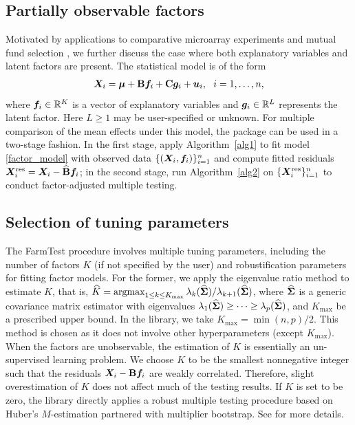 \subsection{Partially observable factors}\label{sec:mix_f}

Motivated by applications to comparative microarray experiments \citep{LS2008, FKC2009} and mutual fund selection \citep{LD2019}, we further discuss the case where both explanatory variables and latent factors are present. The statistical model is of the form
\begin{align}
	\bm{X}_i = \bm{\mu} + \mathbf{B} \bm f_i + \mathbf{C} \bm{g}_i +\bm{u}_i ,  \ \ i=1,\ldots, n ,  \nonumber
	\end{align}
where $\bm f_i \in \mathbb{R}^K$ is a vector of explanatory variables and $\bm{g}_i \in \mathbb{R}^L$ represents the latent factor.
Here $L\geq 1$ may be user-specified or unknown.
For multiple comparison of the mean effects under this model, the  package can be used in a two-stage fashion. In the first stage,  apply Algorithm~\ref{alg1} to fit model \eqref{factor_model} with observed data $\{( \bm{X}_i, \bm f_i)\}_{i=1}^n$ and compute fitted residuals $\bm{X}^{{\rm res}}_i = \bm{X}_i- \widehat{\mathbf{B}} \bm f_i$; in the second stage,  run Algorithm~\ref{alg2} on $\{\bm{X}^{{\rm res}}_i\}_{i=1}^n$ to conduct factor-adjusted multiple testing.

\subsection{Selection of tuning parameters}\label{sec:tuning}

The FarmTest procedure involves multiple tuning parameters, including the number of factors $K$ (if not specified by the user) and  robustification parameters for fitting factor models. For the former, we apply the eigenvalue ratio method \citep{LamYao,Ahn_Horen_2013} to estimate $K$, that is, $\widehat{K}=\mathop{\mathrm{argmax}}_{ 1\leq k \leq K_{\max}}  \lambda_k( \widehat {\bm{\Sigma}})/ \lambda_{k+1}( \widehat {\bm{\Sigma}} )$, where $\widehat {\bm{\Sigma}}$ is a generic covariance matrix estimator with eigenvalues $\lambda_1(\widehat {\bm{\Sigma}}) \geq \cdots \geq \lambda_p(\widehat  {\bm{\Sigma}})$, and $K_{\max}$ be a prescribed upper bound. In the library, we take $K_{\max} = \min(n,p)/2$.  This method is chosen as it does not involve other hyperparameters (except $K_{\max}$).
When the factors are unobservable, the estimation of $K$ is essentially an un-supervised learning problem. We choose $K$ to be the smallest nonnegative integer such that the residuals $\bm{X}_i-\mathbf{B}\bm f_i$ are weakly correlated. Therefore, slight overestimation of $K$ does not  affect much of the testing results. If $K$ is  set to be zero, the  library directly applies a robust multiple testing procedure based on Huber's $M$-estimation partnered with multiplier bootstrap. See \cite{ZBFL2017} for more details.



